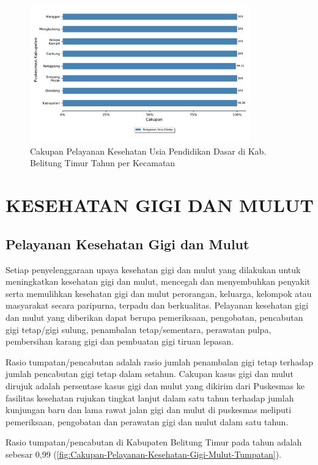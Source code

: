 \begin{figure}[H]
    \centering
    \includegraphics[width=0.85\textwidth]{bab_05/bab_05_26_kesehatanSiswa_spm}
    \caption{Cakupan Pelayanan Kesehatan Usia Pendidikan Dasar di Kab. Belitung Timur Tahun \tP per Kecamatan}
    \label{fig:Cakupan-Pelayanan-Kesehatan-Usia-Dikdas}
\end{figure}

\section{KESEHATAN GIGI DAN MULUT}
\subsection{Pelayanan Kesehatan Gigi dan Mulut}
Setiap penyelenggaraan upaya kesehatan gigi dan mulut yang dilakukan untuk meningkatkan kesehatan gigi dan mulut, mencegah dan menyembuhkan penyakit serta memulihkan kesehatan gigi dan mulut perorangan, keluarga, kelompok atau masyarakat secara paripurna, terpadu dan berkualitas.
Pelayanan kesehatan gigi dan mulut yang diberikan dapat berupa pemeriksaan, pengobatan, pencabutan gigi tetap/gigi sulung, penambalan tetap/sementara, perawatan pulpa, pembersihan karang gigi dan pembuatan gigi tiruan lepasan.

Rasio tumpatan/pencabutan adalah rasio jumlah penambalan gigi tetap terhadap jumlah pencabutan gigi tetap dalam setahun.
Cakupan kasus gigi dan mulut dirujuk adalah persentase kasus gigi dan mulut yang dikirim dari Puskesmas ke fasilitas kesehatan rujukan tingkat lanjut dalam satu tahun terhadap jumlah kunjungan baru dan lama rawat jalan gigi dan mulut di puskesmas meliputi pemeriksaan, pengobatan dan perawatan gigi dan mulut dalam satu tahun.

Rasio tumpatan/pencabutan di Kabupaten Belitung Timur pada tahun \tP adalah sebesar 0,99 (\autoref{fig:Cakupan-Pelayanan-Kesehatan-Gigi-Mulut-Tumpatan}).

